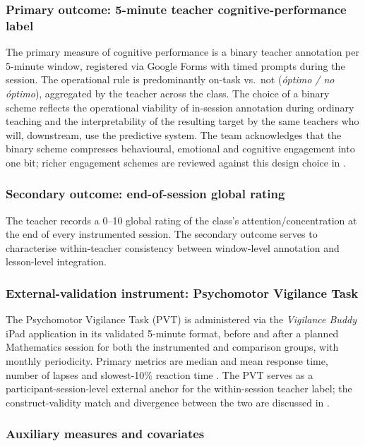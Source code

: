 \subsubsection{Primary outcome: 5-minute teacher cognitive-performance label}

The primary measure of cognitive performance is a binary teacher annotation per 5-minute window, registered via Google Forms with timed prompts during the session. The operational rule is predominantly on-task vs.\ not (\emph{óptimo / no óptimo}), aggregated by the teacher across the class. The choice of a binary scheme reflects the operational viability of in-session annotation during ordinary teaching and the interpretability of the resulting target by the same teachers who will, downstream, use the predictive system. The team acknowledges that the binary scheme compresses behavioural, emotional and cognitive engagement into one bit; richer engagement schemes are reviewed against this design choice in .

\subsubsection{Secondary outcome: end-of-session global rating}

The teacher records a 0--10 global rating of the class's attention/concentration at the end of every instrumented session. The secondary outcome serves to characterise within-teacher consistency between window-level annotation and lesson-level integration.

\subsubsection{External-validation instrument: Psychomotor Vigilance Task}

The Psychomotor Vigilance Task (PVT) is administered via the \emph{Vigilance Buddy} iPad application in its validated 5-minute format, before and after a planned Mathematics session for both the instrumented and comparison groups, with monthly periodicity. Primary metrics are median and mean response time, number of lapses and slowest-10\% reaction time \parencite{Dinges1985_pvt,Loh2004_pvt_short,Basner2011_pvt,Basner2018_pvt_practice}. The PVT serves as a participant-session-level external anchor for the within-session teacher label; the construct-validity match and divergence between the two are discussed in .

\subsubsection{Auxiliary measures and covariates}

